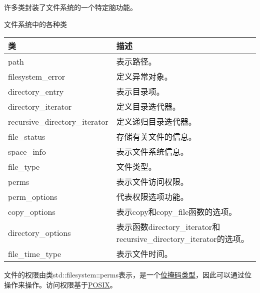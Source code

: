 许多类封装了文件系统的一个特定脑功能。

\begin{center}
文件系统中的各种类
\end{center}

\begin{longtable}[c]{|l|l|}
\hline
\textbf{类}                 & \textbf{描述}                                      \\ \hline
\endfirsthead
%
\endhead
%
path                           & 表示路径。                                        \\ \hline
filesystem\_error              & 定义异常对象。                              \\ \hline
directory\_entry               & 表示目录项。                             \\ \hline
directory\_iterator            & 定义目录迭代器。                             \\ \hline
recursive\_directory\_iterator & 定义递归目录迭代器。                   \\ \hline
file\_status                   & 存储有关文件的信息。                        \\ \hline
space\_info                    & 表示文件系统信息。                        \\ \hline
file\_type                     & 文件类型。                            \\ \hline
perms                          & 表示文件访问权限。                       \\ \hline
perm\_options                  & 代表权限选项功能。          \\ \hline
copy\_options                  & 表示copy和copy\_file函数的选项。 \\ \hline
directory\_options & 表示函数directory\_iterator和recursive\_directory\_iterator的选项。 \\ \hline
file\_time\_type               & 表示文件时间。                                     \\ \hline
\end{longtable}



文件的权限由类std::filesystem::perms表示，是一个\href{http://en.cppreference.com/w/cpp/concept/BitmaskType}{位掩码类型}，因此可以通过位操作来操作。访问权限基于\href{https://en.wikipedia.org/wiki/POSIX}{POSIX}。

